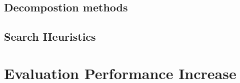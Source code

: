   
\subsection{Decompostion methods}
\label{sec:Decompostion methods}

  
\subsection{Search Heuristics}
\label{sec:Search Heuristics}


\section{Evaluation Performance Increase}
\label{sec:Evaluation Performance Increase}





\printbibliography[heading=bibintoc]





